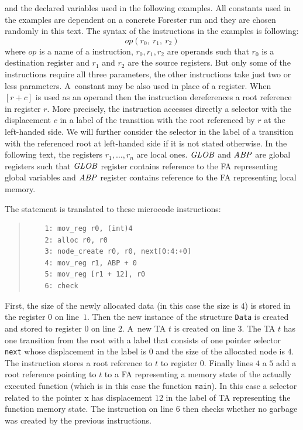 	and the declared variables  used in the following examples.
	All constants used in the examples are dependent on a concrete Forester
	run and they are chosen randomly in this text.
	The syntax of the instructions in the examples is following:
	$$ op(r_0,\ r_1,\ r_2)$$
	where $op$ is a name of a instruction,
	$r_0, r_1, r_2$ are operands such that $r_0$ is a destination register and
	$r_1$ and $r_2$ are the source registers.
	But only some of the instructions require all three parameters,
	the other instructions take just two or less parameters.
	A~constant may be also used in place of a register.
	When $[r+c]$ is used as an operand then the instruction dereferences a root reference in register $r$.
	More precisely, the instruction accesses directly a selector
	with the displacement $c$ in a label of the transition with the root referenced by $r$ at the left-handed side.
	We will further consider the selector in the label of a transition with
	the referenced root at left-handed side if it is not stated otherwise.
	In the following text, the registers $r_1,\ldots,r_n$ are local ones.
	$\mathit{GLOB}$ and $\mathit{ABP}$ are global registers such that $\mathit{GLOB}$ register contains reference to the FA representing
	global variables and $\mathit{ABP}$ register contains reference to the FA representing local memory.

\bexmp
	The statement  is translated
	to these microcode instructions:
	\begin{quote}
	\begin{verbatim}
	1: mov_reg r0, (int)4
	2: alloc r0, r0
	3: node_create r0, r0, next[0:4:+0]
	4: mov_reg r1, ABP + 0
	5: mov_reg [r1 + 12], r0    
	6: check
	\end{verbatim}
	\end{quote}

	First, the size of the newly allocated data (in this case the size is $4$)
	is stored in the register $0$ on line~$1$.
	Then the new instance of the structure {\tt Data} is created and stored to register $0$ on line $2$.
	A~new TA $t$ is created on line $3$.
	The TA $t$ has one transition from the root with a label that consists of
	one pointer selector {\tt next} whose displacement in the label
	is $0$ and the size of the allocated node is $4$.
	The instruction  stores a root reference to $t$ to register $0$.
	Finally lines $4$ a $5$ add a root reference pointing to $t$ to a FA representing
	a memory state of the actually executed function (which is in this case the function {\tt main}).
	In this case a selector related to the pointer x has displacement $12$ in the label of TA
	representing the function memory state.
	The instruction on line $6$ then checks whether no garbage was created by the previous instructions.
\eexmp


